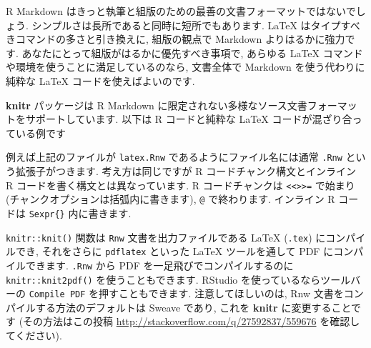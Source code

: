 \documentclass[
  11pt,
  lualatex,ja=standard,jafont=noto]{bxjsreport}
\newenvironment{Shaded}{\begin{snugshade}}{\end{snugshade}}
\newcommand{\BuiltInTok}[1]{#1}
\newcommand{\ExtensionTok}[1]{#1}
\newcommand{\FunctionTok}[1]{\textcolor[rgb]{0.00,0.00,0.00}{#1}}
\newcommand{\KeywordTok}[1]{\textcolor[rgb]{0.13,0.29,0.53}{\textbf{#1}}}
\newcommand{\NormalTok}[1]{#1}
\newcommand{\SpecialCharTok}[1]{\textcolor[rgb]{0.00,0.00,0.00}{#1}}
\newcommand{\SpecialStringTok}[1]{\textcolor[rgb]{0.31,0.60,0.02}{#1}}
\begin{document}
R Markdown はきっと執筆と組版のための最善の文書フォーマットではないでしょう. シンプルさは長所であると同時に短所でもあります. LaTeX はタイプすべきコマンドの多さと引き換えに, 組版の観点で Markdown よりはるかに強力です. あなたにとって組版がはるかに優先すべき事項で, あらゆる LaTeX コマンドや環境を使うことに満足しているのなら, 文書全体で Markdown を使う代わりに純粋な LaTeX コードを使えばよいのです.

\textbf{knitr} パッケージは R Markdown に限定されない多様なソース文書フォーマットをサポートしています. 以下は R コードと純粋な LaTeX コードが混ざり合っている例です

\begin{Shaded}
\end{Shaded}

例えば上記のファイルが \texttt{latex.Rnw} であるようにファイル名には通常 \texttt{.Rnw} という拡張子がつきます. 考え方は同じですが R コードチャンク構文とインライン R コードを書く構文とは異なっています. R コードチャンクは \texttt{\textless{}\textless{}\textgreater{}\textgreater{}=} で始まり (チャンクオプションは括弧内に書きます), \texttt{@} で終わります. インライン R コードは \texttt{Sexpr\{\}} 内に書きます.

\texttt{knitr::knit()} 関数は \texttt{Rnw} 文書を出力ファイルである LaTeX (\texttt{.tex}) にコンパイルでき, それをさらに \texttt{pdflatex} といった LaTeX ツールを通して PDF にコンパイルできます. \texttt{.Rnw} から PDF を一足飛びでコンパイルするのに \texttt{knitr::knit2pdf()} を使うこともできます. RStudio を使っているならツールバーの \texttt{Compile PDF} を押すこともできます. 注意してほしいのは, Rnw 文書をコンパイルする方法のデフォルトは Sweave であり, これを \textbf{knitr} に変更することです (その方法はこの投稿 \url{http://stackoverflow.com/q/27592837/559676} を確認してください).
\end{document}

